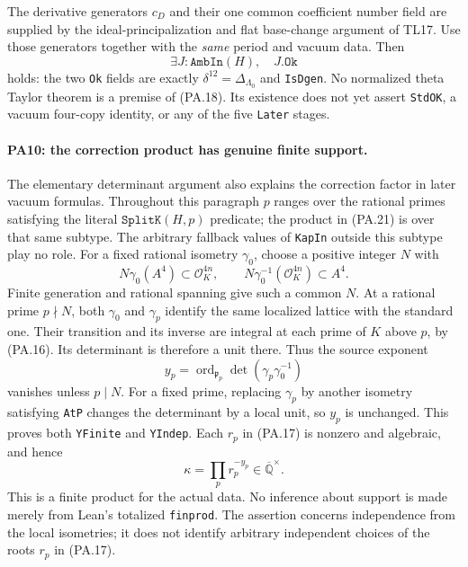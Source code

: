 The derivative generators $c_D$ and their one common coefficient
number field are supplied by the ideal-principalization and flat
base-change argument of TL17. Use those generators together with
the \emph{same} period and vacuum data. Then
\[
                \exists J:\texttt{AmbIn}(H),\quad J.\texttt{Ok}
                                                               \tag{PA.18}
\]
holds: the two \texttt{Ok} fields are exactly
$\delta^{12}=\Delta_{\Lambda_0}$ and \texttt{IsDgen}.
No normalized theta Taylor theorem is a premise of (PA.18).
Its existence does not yet assert \texttt{StdOK}, a vacuum
four-copy identity, or any of the five \texttt{Later} stages.

\paragraph{PA10: the correction product has genuine finite support.}
The elementary determinant argument also explains the correction
factor in later vacuum formulas. Throughout this paragraph $p$
ranges over the rational primes satisfying the literal
$\texttt{SplitK}(H,p)$ predicate; the product in (PA.21) is over
that same subtype. The arbitrary fallback values of \texttt{KapIn}
outside this subtype play no role. For a fixed rational isometry
$\gamma_0$, choose a positive integer $N$ with
\[
 N\gamma_0(A^4)\subset\mathcal O_K^{4n},\qquad
 N\gamma_0^{-1}(\mathcal O_K^{4n})\subset A^4.                  \tag{PA.19}
\]
Finite generation and rational spanning give such a common $N$.
At a rational prime $p\nmid N$, both $\gamma_0$ and $\gamma_p$
identify the same localized lattice with the standard one.
Their transition and its inverse are integral at each prime of
$K$ above $p$, by (PA.16). Its determinant is therefore a unit
there. Thus the source exponent
\[
 y_p=\operatorname{ord}_{\mathfrak p_p}
                  \det(\gamma_p\gamma_0^{-1})
                                                               \tag{PA.20}
\]
vanishes unless $p\mid N$. For a fixed prime, replacing
$\gamma_p$ by another isometry satisfying \texttt{AtP} changes
the determinant by a local unit, so $y_p$ is unchanged.
This proves both \texttt{YFinite} and \texttt{YIndep}.
Each $r_p$ in (PA.17) is nonzero and algebraic, and hence
\[
                     \kappa=\prod_p r_p^{-y_p}
                     \in\overline{\mathbb Q}^{\times}.         \tag{PA.21}
\]
This is a finite product for the actual data. No inference about
support is made merely from Lean's totalized \texttt{finprod}.
The assertion concerns independence from the local isometries;
it does not identify arbitrary independent choices of the roots
$r_p$ in (PA.17).

